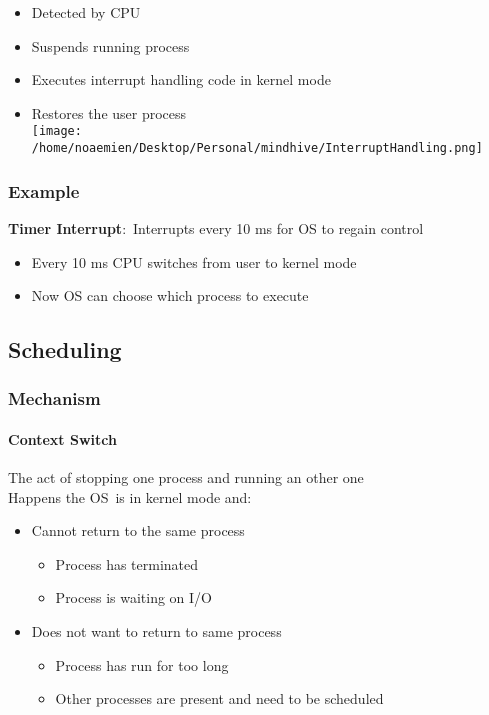 \documentclass[
]{article}
\providecommand{\tightlist}{%
  \setlength{\itemsep}{0pt}\setlength{\parskip}{0pt}}
\begin{document}
\begin{itemize}
\tightlist
\item
  Detected by CPU
\item
  Suspends running process
\item
  Executes interrupt handling code in kernel mode
\item
  Restores the user process\\
  \texttt{[image: /home/noaemien/Desktop/Personal/mindhive/InterruptHandling.png]}
\end{itemize}

\hypertarget{example}{%
\subsubsection{Example}\label{example}}

\textbf{Timer Interrupt}:~Interrupts every 10 ms for OS to regain
control

\begin{itemize}
\tightlist
\item
  Every 10 ms CPU switches from user to kernel mode
\item
  Now OS can choose which process to execute
\end{itemize}

\hypertarget{scheduling}{%
\subsection{Scheduling}\label{scheduling}}

\hypertarget{mechanism}{%
\subsubsection{Mechanism}\label{mechanism}}

\hypertarget{context-switch}{%
\paragraph{Context Switch}\label{context-switch}}

The act of stopping one process and running an other one\\
Happens the OS~is in kernel mode and:

\begin{itemize}
\tightlist
\item
  Cannot return to the same process

  \begin{itemize}
  \tightlist
  \item
    Process has terminated
  \item
    Process is waiting on I/O
  \end{itemize}
\item
  Does not want to return to same process

  \begin{itemize}
  \tightlist
  \item
    Process has run for too long
  \item
    Other processes are present and need to be scheduled
  \end{itemize}
\end{itemize}
\end{document}
